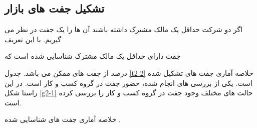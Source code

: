 %	 
%
%		
%
%
%        



\subsection{تشکیل جفت های بازار }
اگر دو شرکت حداقل یک مالک مشترک داشته باشند آن ها را یک جفت در نظر می گیریم. با این تعریف   
 
جفت دارای حداقل یک مالک مشترک شناسایی شده است که 

درصد از جفت های ممکن می باشد. جدول 
  \ref{t2-2}
 	 خلاصه آماری جفت های تشکیل شده است. یکی از بررسی های انجام شده، حضور جفت در گروه کسب و کار است. در این راستا شکل 
 	 \ref{g2-1} 
 	 حالت های مختلف وجود جفت در گروه کسب و کار را بررسی کرده است.
 	  \begin{table}[htbp]
 	   \centering
 	   \caption{ خلاصه آماری جفت های شناسایی شده .}
 	   \label{t2-2}
 	    \begin{LTR}
 	     	 	\lr{  \resizebox{1\textwidth}{!}
 	           {
 	  
 	    }}
 	     	 \end{LTR}
 	     \end{table} 
 	     
